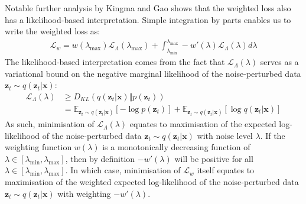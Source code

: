 \documentclass[ oneside,%
                    author={George Herbert},
                    degree={MSci},
                     title={Video Diffusion Models for Climate Simulations},
                  subtitle={}]{dissertation}
\begin{document}
Notable further analysis by Kingma and Gao \cite{Understanding_Diffusion_Objective_Kingma} shows that the weighted loss also has a likelihood-based interpretation. Simple integration by parts enables us to write the weighted loss as:
\begin{align}
      \mathcal{L}_w = w(\lambda_{\max})\mathcal{L}_\Lambda(\lambda_{\max}) + \int_{\lambda_{\min}}^{\lambda_{\max}}-w'(\lambda)\mathcal{L}_\Lambda(\lambda) d\lambda
\end{align}
The likelihood-based interpretation comes from the fact that $\mathcal{L}_\Lambda(\lambda)$ serves as a variational bound on the negative marginal likelihood of the noise-perturbed data $\mathbf{z}_t\sim q(\mathbf{z}_t|\mathbf{x})$:
\begin{align}
      \mathcal{L}_\Lambda(\lambda)&\ge D_{KL}(q(\mathbf{z}_t|\mathbf{x})\Vert p(\mathbf{z}_t))\\
      &=\mathbb{E}_{\mathbf{z}_t\sim q(\mathbf{z}_t|\mathbf{x})}\left[-\log p(\mathbf{z}_t)\right]+\mathbb{E}_{\mathbf{z}_t\sim q(\mathbf{z}_t|\mathbf{x})}\left[\log q(\mathbf{z}_t|\mathbf{x})\right]
\end{align}
As such, minimisation of $\mathcal{L}_\Lambda(\lambda)$ equates to maximisation of the expected log-likelihood of the noise-perturbed data $\mathbf{z}_t\sim q(\mathbf{z}_t|\mathbf{x})$ with noise level $\lambda$. If the weighting function $w(\lambda)$ is a monotonically decreasing function of $\lambda\in [\lambda_{\min}, \lambda_{\max}]$, then by definition $-w'(\lambda)$ will be positive for all $\lambda\in [\lambda_{\min}, \lambda_{\max}]$. In which case, minimisation of $\mathcal{L}_w$ itself equates to maximisation of the weighted expected log-likelihood of the noise-perturbed data $\mathbf{z}_t\sim q(\mathbf{z}_t|\mathbf{x})$ with weighting $-w'(\lambda)$. 
\end{document}
